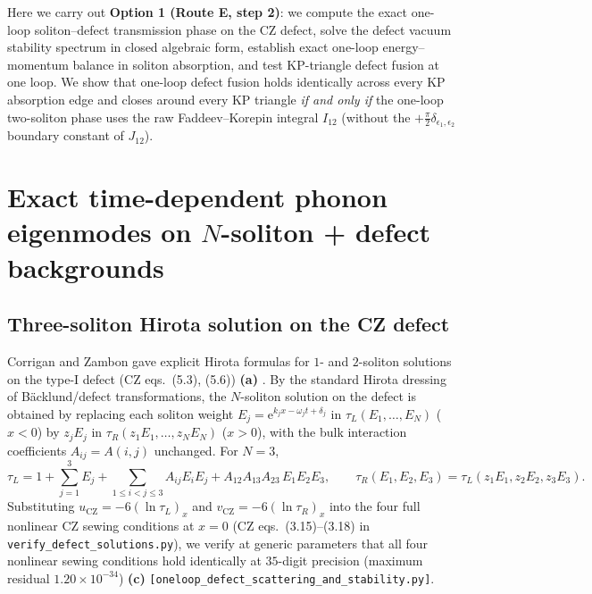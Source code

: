 \documentclass[11pt,a4paper]{article}
\newcommand{\ee}{\mathrm{e}}
\begin{document}
Here we carry out \textbf{Option 1 (Route E, step 2)}: we compute the exact
one-loop soliton--defect transmission phase on the CZ defect, solve the defect
vacuum stability spectrum in closed algebraic form, establish exact one-loop
energy--momentum balance in soliton absorption, and test KP-triangle defect
fusion at one loop. We show that one-loop defect fusion holds identically across
every KP absorption edge and closes around every KP triangle \emph{if and only if}
the one-loop two-soliton phase uses the raw Faddeev--Korepin integral $I_{12}$
(without the $+\frac{\pi}{2}\delta_{\epsilon_1,\epsilon_2}$ boundary constant of
$J_{12}$).

\section{Exact time-dependent phonon eigenmodes on $N$-soliton + defect backgrounds}
\label{sec:scattering}

\subsection{Three-soliton Hirota solution on the CZ defect}

Corrigan and Zambon gave explicit Hirota formulas for $1$- and $2$-soliton
solutions on the type-I defect (CZ eqs.~(5.3), (5.6)) \textbf{(a)} \cite{CZ2023}.
By the standard Hirota dressing of B\"acklund/defect transformations, the
$N$-soliton solution on the defect is obtained by replacing each soliton weight
$E_j = \ee^{k_j x - \omega_j t + \delta_j}$ in $\tau_L(E_1,\dots,E_N)$ ($x<0$) by
$z_j E_j$ in $\tau_R(z_1 E_1,\dots,z_N E_N)$ ($x>0$), with the bulk interaction
coefficients $A_{ij} = A(i,j)$ unchanged. For $N=3$,
\begin{equation}\label{eq:tau3_defect}
  \tau_L = 1 + \sum_{j=1}^3 E_j + \sum_{1\le i<j\le 3} A_{ij} E_i E_j
  + A_{12}A_{13}A_{23}\,E_1 E_2 E_3, \qquad
  \tau_R(E_1,E_2,E_3) = \tau_L(z_1 E_1, z_2 E_2, z_3 E_3).
\end{equation}
Substituting $u_{\mathrm{CZ}} = -6(\ln\tau_L)_x$ and $v_{\mathrm{CZ}} = -6(\ln\tau_R)_x$
into the four full nonlinear CZ sewing conditions at $x=0$ (CZ eqs.~(3.15)--(3.18)
in \texttt{verify\_defect\_solutions.py}), we verify at generic parameters that
all four nonlinear sewing conditions hold identically at $35$-digit precision
(maximum residual $1.20\times 10^{-34}$) \textbf{(c)}
\texttt{[oneloop\_defect\_scattering\_and\_stability.py]}.
\end{document}
